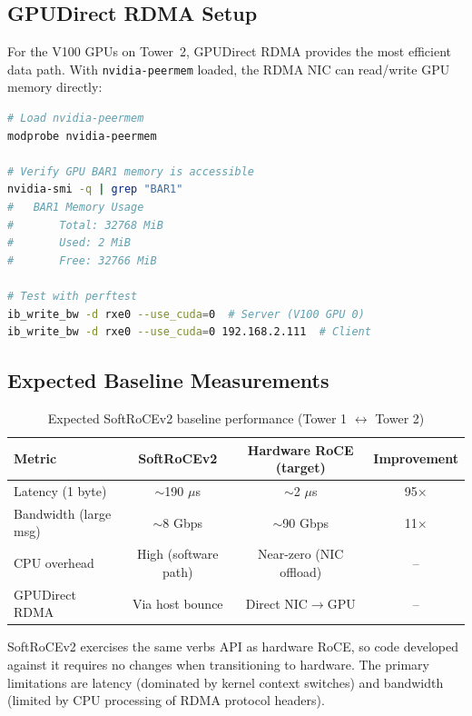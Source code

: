 \documentclass[11pt,letterpaper]{article}
\theoremstyle{definition}
\begin{document}
\subsection{GPUDirect RDMA Setup}

For the V100 GPUs on Tower~2, GPUDirect RDMA provides the most efficient data path. With \texttt{nvidia-peermem} loaded, the RDMA NIC can read/write GPU memory directly:

\begin{lstlisting}[language=bash, caption={GPUDirect RDMA verification}]
# Load nvidia-peermem
modprobe nvidia-peermem

# Verify GPU BAR1 memory is accessible
nvidia-smi -q | grep "BAR1"
#   BAR1 Memory Usage
#       Total: 32768 MiB
#       Used: 2 MiB
#       Free: 32766 MiB

# Test with perftest
ib_write_bw -d rxe0 --use_cuda=0  # Server (V100 GPU 0)
ib_write_bw -d rxe0 --use_cuda=0 192.168.2.111  # Client
\end{lstlisting}

\subsection{Expected Baseline Measurements}

\begin{table}[htbp]
\centering
\caption{Expected SoftRoCEv2 baseline performance (Tower 1 $\leftrightarrow$ Tower 2)}
\label{tab:softroce-baseline}
\begin{tabular}{@{}lccc@{}}
\toprule
\textbf{Metric} & \textbf{SoftRoCEv2} & \textbf{Hardware RoCE (target)} & \textbf{Improvement} \\
\midrule
Latency (1 byte) & $\sim$190 $\mu$s & $\sim$2 $\mu$s & 95$\times$ \\
Bandwidth (large msg) & $\sim$8 Gbps & $\sim$90 Gbps & 11$\times$ \\
CPU overhead & High (software path) & Near-zero (NIC offload) & -- \\
GPUDirect RDMA & Via host bounce & Direct NIC$\to$GPU & -- \\
\bottomrule
\end{tabular}
\end{table}

SoftRoCEv2 exercises the same verbs API as hardware RoCE, so code developed against it requires no changes when transitioning to hardware. The primary limitations are latency (dominated by kernel context switches) and bandwidth (limited by CPU processing of RDMA protocol headers).
\end{document}
